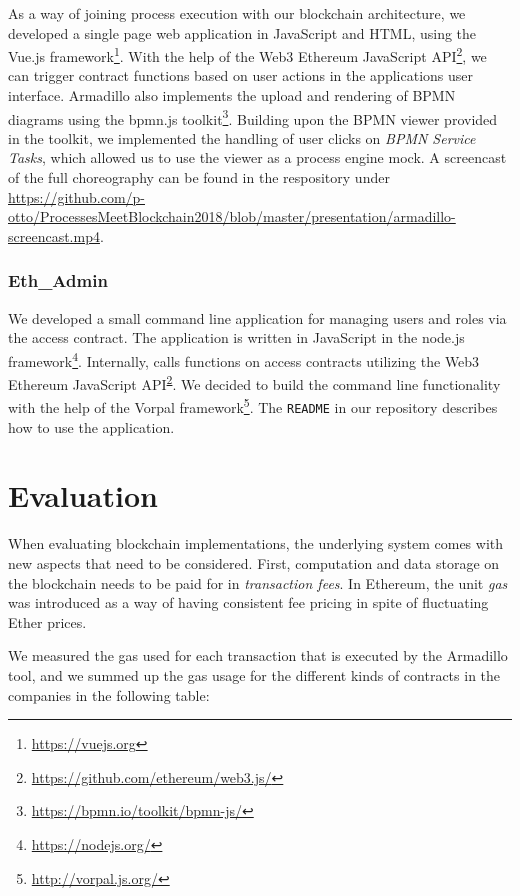 \documentclass[runningheads]{llncs}
\begin{document}
As a way of joining process execution with our blockchain architecture, we developed a single page web application in JavaScript and HTML, using the Vue.js framework\footnote{\url{https://vuejs.org}}.
With the help of the Web3 Ethereum JavaScript API\footnote{\label{web3}\url{https://github.com/ethereum/web3.js/}}, we can trigger contract functions based on user actions in the applications user interface.
Armadillo also implements the upload and rendering of BPMN diagrams using the bpmn.js toolkit\footnote{\url{https://bpmn.io/toolkit/bpmn-js/}}.
Building upon the BPMN viewer provided in the toolkit, we implemented the handling of user clicks on \emph{BPMN Service Tasks}, which allowed us to use the viewer as a process engine mock.
A screencast of the full choreography can be found in the respository under \url{https://github.com/p-otto/ProcessesMeetBlockchain2018/blob/master/presentation/armadillo-screencast.mp4}.

\subsubsection{Eth\_Admin}

We developed a small command line application for managing users and roles via the access contract.
The application is written in JavaScript in the node.js framework\footnote{\url{https://nodejs.org/}}.
Internally, calls functions on access contracts utilizing the Web3 Ethereum JavaScript API\textsuperscript{\ref{web3}}.
We decided to build the command line functionality with the help of the Vorpal framework\footnote{\url{http://vorpal.js.org/}}.
The \texttt{README} in our repository describes how to use the application.

\section{Evaluation} \label{evaluation}

When evaluating blockchain implementations, the underlying system comes with new aspects that need to be considered.
First, computation and data storage on the blockchain needs to be paid for in \emph{transaction fees}.
In Ethereum, the unit \emph{gas} was introduced as a way of having consistent fee pricing in spite of fluctuating Ether prices.

We measured the gas used for each transaction that is executed by the Armadillo tool, and we summed up the gas usage for the different kinds of contracts in the companies in the following table:
\end{document}
